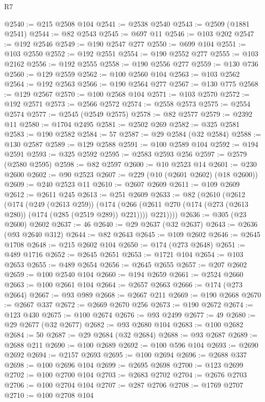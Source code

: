 \begin{lexlean}{R7}
\begin{coremodule}
@2540 := @215 @2508 @104
@2541 := @2538 @2540
@2543 := @2509 (@1881 @2541)
@2544 := @82 @2543
@2545 := @697 @11
@2546 := @103 @202
@2547 := @192 @2546
@2549 := @190 @2547 @277
@2550 := @699 @104
@2551 := @103 @2550
@2552 := @192 @2551
@2554 := @190 @2552 @277
@2555 := @103 @2162
@2556 := @192 @2555
@2558 := @190 @2556 @277
@2559 := @130 @736
@2560 := @129 @2559
@2562 := @100 @2560 @104
@2563 := @103 @2562
@2564 := @192 @2563
@2566 := @190 @2564 @277
@2567 := @130 @775
@2568 := @129 @2567
@2570 := @100 @2568 @104
@2571 := @103 @2570
@2572 := @192 @2571
@2573 := @2566 @2572
@2574 := @2558 @2573
@2575 := @2554 @2574
@2577 := @2545 (@2549 @2575)
@2578 := @82 @2577
@2579 := @2392 @11
@2580 := @1704 @2495
@2581 := @2502 @269
@2582 := @325 @2581
@2583 := @190 @2582
@2584 := 57
@2587 := @29 @2584 (@32 @2584)
@2588 := @130 @2587
@2589 := @129 @2588
@2591 := @100 @2589 @104
@2592 := @194 @2591
@2593 := @325 @2592
@2595 := @2583 @2593 @256
@2597 := @2579 (@2580 @2595)
@2598 := @82 @2597
@2600 := @10 @2523 @14
@2601 := @230 @2600
@2602 := @90 @2523
@2607 := @229 (@10 (@2601 @2602) (@18 @2600))
@2609 := @240 @2523 @11
@2610 := @2607 @2609
@2611 := @109 @2609
@2612 := @2611 @245
@2613 := @251 @2609
@2633 := @82
    (@2610
      (@2612
        (@174
          (@249 (@2613 @259))
          (@174
            (@266 (@2611 @270 (@174 (@273 (@2613 @280)) (@174 (@285 (@2519 @289)) @221))))
            @221))))
@2636 := @305 (@23 @2600) @2602
@2637 := 46
@2640 := @29 @2637 (@32 @2637)
@2643 := @2636 (@93 @2640 @312)
@2644 := @82 @2643
@2645 := @109 @2602
@2646 := @2645 @1708
@2648 := @215 @2602 @104
@2650 := @174 (@273 @2648)
@2651 := @489 @1716
@2652 := @2645 @2651
@2653 := @1721 @104
@2654 := @103 @2653
@2655 := @489 @2654
@2656 := @2645 @2655
@2657 := @207 @2602
@2659 := @100 @2540 @104
@2660 := @194 @2659
@2661 := @2524 @2660
@2663 := @100 @2661 @104
@2664 := @2657 @2663
@2666 := @174 (@273 @2664)
@2667 := @93 @989
@2668 := @2667 @211
@2669 := @190 @2668
@2670 := @2667 @337
@2672 := @2669 @2670 @256
@2673 := @190 @2672
@2674 := @123 @430
@2675 := @100 @2674
@2676 := @93 @2499
@2677 := 49
@2680 := @29 @2677 (@32 @2677)
@2682 := @93 @2680 @104
@2683 := @100 @2682
@2684 := 50
@2687 := @29 @2684 (@32 @2684)
@2688 := @93 @2687
@2689 := @2688 @211
@2690 := @100 @2689
@2692 := @100 @596 @104
@2693 := @2690 @2692
@2694 := @2157 @2693
@2695 := @100 @2694
@2696 := @2688 @337
@2698 := @100 @2696 @104
@2699 := @2695 @2698
@2700 := @123 @2699
@2702 := @100 @2700 @104
@2703 := @2683 @2702
@2704 := @2676 @2703
@2706 := @100 @2704 @104
@2707 := @287 @2706
@2708 := @1769 @2707
@2710 := @100 @2708 @104

\end{coremodule}
\end{lexlean}
